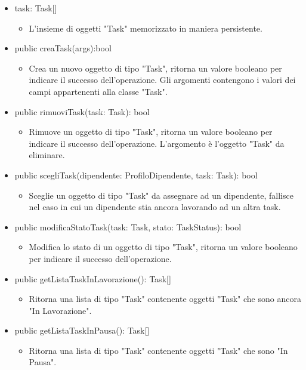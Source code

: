 \documentclass{report}
\begin{document}
\begin{itemize}
\item task: Task[]
\begin{itemize}
    \item L'insieme di oggetti "Task" memorizzato in maniera persistente.
\end{itemize}
\item public creaTask(args):bool
\begin{itemize}
    \item Crea un nuovo oggetto di tipo "Task", ritorna un valore booleano per indicare il successo dell'operazione. Gli argomenti contengono i valori dei campi appartenenti alla classe "Task". 
\end{itemize}
\item public rimuoviTask(task: Task): bool
\begin{itemize}
    \item Rimuove un oggetto di tipo "Task", ritorna un valore booleano per indicare il successo dell'operazione. L'argomento è l'oggetto "Task" da eliminare.
\end{itemize}
\item public scegliTask(dipendente: ProfiloDipendente, task: Task): bool
\begin{itemize}
    \item Sceglie un oggetto di tipo "Task" da assegnare ad un dipendente, fallisce nel caso in cui un dipendente stia ancora lavorando ad un altra task.
\end{itemize}
\item public modificaStatoTask(task: Task, stato: TaskStatus): bool
\begin{itemize}
    \item Modifica lo stato di un oggetto di tipo "Task", ritorna un valore booleano per indicare il successo dell'operazione.
\end{itemize}
\item public getListaTaskInLavorazione(): Task[]
\begin{itemize}
    \item Ritorna una lista di tipo "Task" contenente oggetti "Task" che sono ancora "In Lavorazione".
\end{itemize}
\item public getListaTaskInPausa(): Task[]
\begin{itemize}
    \item Ritorna una lista di tipo "Task" contenente oggetti "Task" che sono "In Pausa".
\end{itemize}

\end{itemize}
\end{document}

